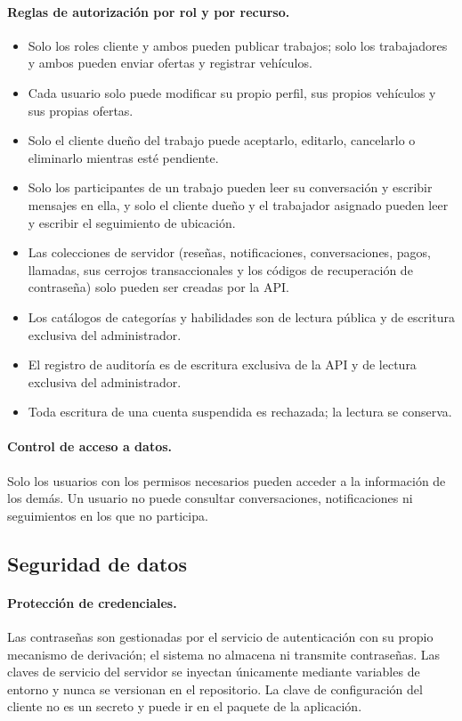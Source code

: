 \documentclass[doc,12pt,a4paper]{apa7}
\begin{document}
\paragraph{Reglas de autorización por rol y por recurso.}
\begin{itemize}
    \item Solo los roles cliente y ambos pueden publicar trabajos; solo los
          trabajadores y ambos pueden enviar ofertas y registrar vehículos.
    \item Cada usuario solo puede modificar su propio perfil, sus propios
          vehículos y sus propias ofertas.
    \item Solo el cliente dueño del trabajo puede aceptarlo, editarlo, cancelarlo
          o eliminarlo mientras esté pendiente.
    \item Solo los participantes de un trabajo pueden leer su conversación y
          escribir mensajes en ella, y solo el cliente dueño y el trabajador
          asignado pueden leer y escribir el seguimiento de ubicación.
    \item Las colecciones de servidor (reseñas, notificaciones, conversaciones,
          pagos, llamadas, sus cerrojos transaccionales y los códigos de
          recuperación de contraseña) solo pueden ser creadas por la API.
    \item Los catálogos de categorías y habilidades son de lectura pública y de
          escritura exclusiva del administrador.
    \item El registro de auditoría es de escritura exclusiva de la API y de
          lectura exclusiva del administrador.
    \item Toda escritura de una cuenta suspendida es rechazada; la lectura se
          conserva.
\end{itemize}

\paragraph{Control de acceso a datos.}
Solo los usuarios con los permisos necesarios pueden acceder a la información de
los demás. Un usuario no puede consultar conversaciones, notificaciones ni
seguimientos en los que no participa.

\subsection{Seguridad de datos}

\paragraph{Protección de credenciales.}
Las contraseñas son gestionadas por el servicio de autenticación con su propio
mecanismo de derivación; el sistema no almacena ni transmite contraseñas.
Las claves de servicio del servidor se inyectan únicamente mediante variables de
entorno y nunca se versionan en el repositorio. La clave de configuración del
cliente no es un secreto y puede ir en el paquete de la aplicación.
\end{document}
